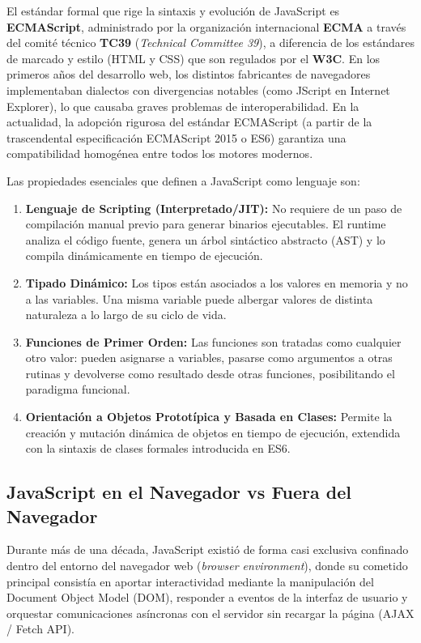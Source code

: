 El estándar formal que rige la sintaxis y evolución de JavaScript es \textbf{ECMAScript}, administrado por la organización internacional \textbf{ECMA} a través del comité técnico \textbf{TC39} (\emph{Technical Committee 39}), a diferencia de los estándares de marcado y estilo (HTML y CSS) que son regulados por el \textbf{W3C}. En los primeros años del desarrollo web, los distintos fabricantes de navegadores implementaban dialectos con divergencias notables (como JScript en Internet Explorer), lo que causaba graves problemas de interoperabilidad. En la actualidad, la adopción rigurosa del estándar ECMAScript (a partir de la trascendental especificación ECMAScript 2015 o ES6) garantiza una compatibilidad homogénea entre todos los motores modernos.

Las propiedades esenciales que definen a JavaScript como lenguaje son:
\begin{enumerate}
    \item \textbf{Lenguaje de Scripting (Interpretado/JIT):} No requiere de un paso de compilación manual previo para generar binarios ejecutables. El runtime analiza el código fuente, genera un árbol sintáctico abstracto (AST) y lo compila dinámicamente en tiempo de ejecución.
    \item \textbf{Tipado Dinámico:} Los tipos están asociados a los valores en memoria y no a las variables. Una misma variable puede albergar valores de distinta naturaleza a lo largo de su ciclo de vida.
    \item \textbf{Funciones de Primer Orden:} Las funciones son tratadas como cualquier otro valor: pueden asignarse a variables, pasarse como argumentos a otras rutinas y devolverse como resultado desde otras funciones, posibilitando el paradigma funcional.
    \item \textbf{Orientación a Objetos Prototípica y Basada en Clases:} Permite la creación y mutación dinámica de objetos en tiempo de ejecución, extendida con la sintaxis de clases formales introducida en ES6.
\end{enumerate}

\subsection{JavaScript en el Navegador vs Fuera del Navegador}

Durante más de una década, JavaScript existió de forma casi exclusiva confinado dentro del entorno del navegador web (\emph{browser environment}), donde su cometido principal consistía en aportar interactividad mediante la manipulación del Document Object Model (DOM), responder a eventos de la interfaz de usuario y orquestar comunicaciones asíncronas con el servidor sin recargar la página (AJAX / Fetch API).


